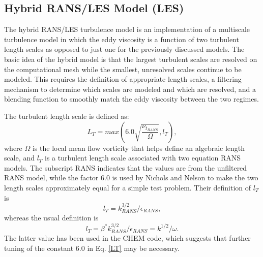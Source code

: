 \subsection{Hybrid RANS/LES Model (LES)}

The hybrid RANS/LES turbulence model\cite{Nichols.2003} is an
implementation of a multiscale turbulence model in which the eddy
viscosity is a function of two turbulent length scales as opposed to
just one for the previously discussed models.  The basic idea of the
hybrid model is that the largest turbulent scales are resolved on the
computational mesh while the smallest, unresolved scales continue to
be modeled.  This requires the definition of appropriate length
scales, a filtering mechanism to determine which scales are modeled
and which are resolved, and a blending function to smoothly match the
eddy viscosity between the two regimes.

The turbulent length scale is defined as:
\begin{equation}
L_T = max (6.0 \sqrt{\frac{\nu_{t_{RANS}}}{{\Omega}}}, l_T),
\label{LT}
\end{equation}
where $\Omega$ is the local mean flow vorticity that helps define an algebraic length scale, and $l_T$ is a turbulent length scale associated with two equation RANS models.  The subscript RANS indicates that the values are from the unfiltered RANS model, while the factor 6.0 is used by Nichols and Nelson to make the two length scales approximately equal for a simple test problem.  Their definition of $l_T$ is
\begin{equation}
l_T = k^{3/2}_{RANS}/\epsilon_{RANS},
\end{equation}
whereas the usual definition is
\begin{equation}
l_T = \beta^* k^{3/2}_{RANS}/\epsilon_{RANS} = k^{1/2}/\omega.
\end{equation}
The latter value has been used in the CHEM code, which suggests that
further tuning of the constant 6.0 in Eq. \ref{LT} may be necessary.

